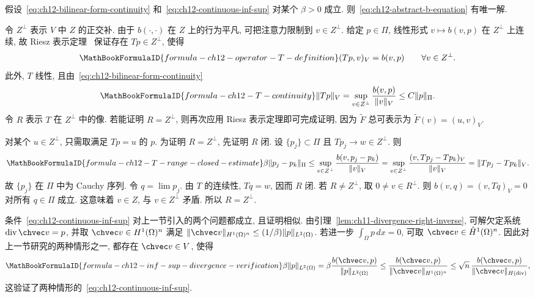 \begin{Lemma}
\label{lem:ch12-inf-sup-unique-solvability}
假设~\eqref{eq:ch12-bilinear-form-continuity} 和~\eqref{eq:ch12-continuous-inf-sup} 对某个 $\beta>0$ 成立. 则~\eqref{eq:ch12-abstract-b-equation} 有唯一解.
\end{Lemma}

\begin{Proof}
令 $Z^\perp$ 表示 $V$ 中 $Z$ 的正交补. 由于 $b(\cdot,\cdot)$ 在 $Z$ 上的行为平凡, 可把注意力限制到 $v\in Z^\perp$. 给定 $p\in\Pi$, 线性形式 $v\mapsto b(v,p)$ 在 $Z^\perp$ 上连续, 故 Riesz 表示定理~ 保证存在 $Tp\in Z^\perp$, 使得
\begin{equation}
\MathBookFormulaID{formula-ch12-operator-T-definition}
\label{eq:ch12-operator-T-definition}
(Tp,v)_V=b(v,p)\qquad\forall v\in Z^\perp.
\end{equation}
此外, $T$ 线性, 且由~\eqref{eq:ch12-bilinear-form-continuity}
\[
\MathBookFormulaID{formula-ch12-T-continuity}
\|Tp\|_V=\sup_{v\in Z^\perp}\frac{b(v,p)}{\|v\|_V}
\leq C\|p\|_\Pi.
\]
令 $R$ 表示 $T$ 在 $Z^\perp$ 中的像. 若能证明 $R=Z^\perp$, 则再次应用 Riesz 表示定理即可完成证明, 因为 $\widetilde F$ 总可表示为 $\widetilde F(v)=(u,v)_V$.

对某个 $u\in Z^\perp$, 只需取满足 $Tp=u$ 的 $p$. 为证明 $R=Z^\perp$, 先证明 $R$ 闭. 设 $\{p_j\}\subset\Pi$ 且 $Tp_j\to w\in Z^\perp$. 则
\[
\MathBookFormulaID{formula-ch12-T-range-closed-estimate}
\beta\|p_j-p_k\|_\Pi
\leq\sup_{v\in Z^\perp}\frac{b(v,p_j-p_k)}{\|v\|_V}
=\sup_{v\in Z^\perp}\frac{(v,Tp_j-Tp_k)_V}{\|v\|_V}
=\|Tp_j-Tp_k\|_V.
\]
故 $\{p_j\}$ 在 $\Pi$ 中为 Cauchy 序列. 令 $q=\lim p_j$. 由 $T$ 的连续性, $Tq=w$, 因而 $R$ 闭. 若 $R\neq Z^\perp$, 取 $0\neq v\in R^\perp$. 则 $b(v,q)=(v,Tq)_V=0$ 对所有 $q\in\Pi$ 成立. 这意味着 $v\in Z$, 与 $v\in Z^\perp$ 矛盾. 所以 $R=Z^\perp$.
\end{Proof}

条件~\eqref{eq:ch12-continuous-inf-sup} 对上一节引入的两个问题都成立, 且证明相似. 由引理~\ref{lem:ch11-divergence-right-inverse}, 可解欠定系统 $\operatorname{div}\chvec v=p$, 并取 $\chvec v\in H^1(\Omega)^n$ 满足 $\|\chvec v\|_{H^1(\Omega)^n}\leq(1/\beta)\|p\|_{L^2(\Omega)}$. 若进一步 $\int_\Omega p\,dx=0$, 可取 $\chvec v\in\mathring H^1(\Omega)^n$. 因此对上一节研究的两种情形之一, 都存在 $\chvec v\in V$, 使得
\[
\MathBookFormulaID{formula-ch12-inf-sup-divergence-verification}
\beta\|p\|_{L^2(\Omega)}
=\beta\frac{b(\chvec v,p)}{\|p\|_{L^2(\Omega)}}
\leq\frac{b(\chvec v,p)}{\|\chvec v\|_{H^1(\Omega)^n}}
\leq\sqrt n\,\frac{b(\chvec v,p)}{\|\chvec v\|_{H(\operatorname{div})}},
\]
这验证了两种情形的~\eqref{eq:ch12-continuous-inf-sup}.
